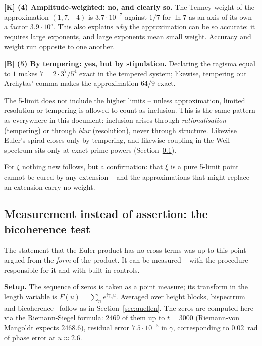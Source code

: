 \textbf{[K] (4) Amplitude-weighted: no, and clearly so.} The Tenney
weight of the approximation $(1,7,-4)$ is $3.7\cdot10^{-7}$ against
$1/7$ for $\ln 7$ as an axis of its own -- a factor $3.9\cdot10^{5}$.
This also explains \emph{why} the approximation can be so accurate: it
requires large exponents, and large exponents mean small weight.
Accuracy and weight run opposite to one another.

\textbf{[B] (5) By tempering: yes, but by stipulation.} Declaring the
ragisma equal to $1$ makes $7 = 2\cdot 3^7/5^4$ exact in the tempered
system; likewise, tempering out Archytas' comma makes the
approximation $64/9$ exact.

\begin{keyresult}
The 5-limit does not include the higher limits -- unless approximation,
limited resolution or tempering is allowed to count as inclusion. This
is the same pattern as everywhere in this document: inclusion arises
through \emph{rationalisation} (tempering) or through \emph{blur}
(resolution), never through structure. Likewise Euler's spiral closes
only by tempering, and likewise coupling in the Weil spectrum sits only
at exact prime powers (Section~\ref{sec:bikoh}).
\end{keyresult}

For $\xi$ nothing new follows, but a confirmation: that $\xi$ is a pure
5-limit point cannot be cured by any extension -- and the
approximations that might replace an extension carry no weight.

\subsection{Measurement instead of assertion: the bicoherence test}
\label{sec:bikoh}

The statement that the Euler product has no cross terms was up to this
point argued from the \emph{form} of the product. It can be measured --
with the procedure responsible for it and with built-in controls.

\textbf{Setup.} The sequence of zeros is taken as a point measure; its
transform in the length variable is $F(u) = \sum_n e^{i\gamma_n u}$.
Averaged over height blocks, bispectrum and bicoherence~\cite{kim1979} follow as in
Section~\ref{sec:quellen}. The zeros are computed here via the
Riemann-Siegel formula: 2469 of them up to $t = 3000$ (Riemann-von
Mangoldt expects $2468.6$), residual error $7.5\cdot10^{-3}$ in
$\gamma$, corresponding to $0.02$~rad of phase error at
$u \approx 2.6$.

